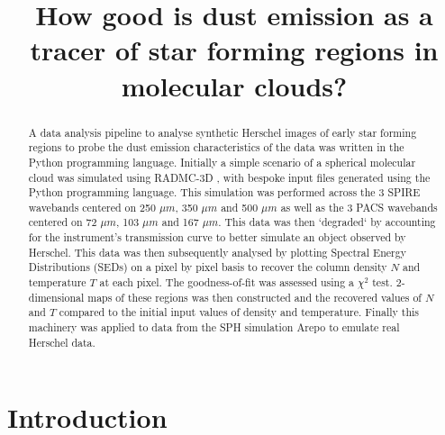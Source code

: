 \documentclass{report}
\title{\vspace{-15mm}\fontsize{24pt}{10pt}\selectfont\textbf{How good is dust emission as a tracer of star forming regions in molecular clouds?}} %
\author{
\large
\textsc{\parbox{\linewidth}{\centering%
Tomas James\endgraf\skip
Student ID: 1158976\endgraf\bigskip}} %
\vspace{-5mm}
}
\date{\large\parbox{\linewidth}{\centering%
  Supervisor: Dr. P. C. Clark \endgraf\bigskip\today}}
\begin{document}
\maketitle %

\thispagestyle{fancy} %


\begin{abstract}
A data analysis pipeline to analyse synthetic Herschel images of early star forming regions to probe the dust emission characteristics of the data was written in the Python programming language. Initially a simple scenario of a spherical molecular cloud was simulated using RADMC-3D \parencite{RADMC-3D}, with bespoke input files generated using the Python programming language. This simulation was performed across the 3 SPIRE \parencite{SPIRE} wavebands centered on 250 $\mu m$, 350 $\mu m$ and 500 $\mu m$ as well as the 3 PACS \parencite{PACS} wavebands centered on 72 $\mu m$, 103 $\mu m$ and 167 $\mu m$. This data was then `degraded` by accounting for the instrument's transmission curve to better simulate an object observed by Herschel. This data was then subsequently analysed by plotting Spectral Energy Distributions (SEDs) on a pixel by pixel basis to recover the column density $N$ and temperature $T$ at each pixel. The goodness-of-fit was assessed using a $\chi^{2}$ test. 2-dimensional maps of these regions was then constructed and the recovered values of $N$ and $T$ compared to the initial input values of density and temperature. Finally this machinery was applied to data from the SPH simulation Arepo to emulate real Herschel data.
\end{abstract}


\tableofcontents %
\pagebreak %


\chapter{Introduction}
\end{document}
